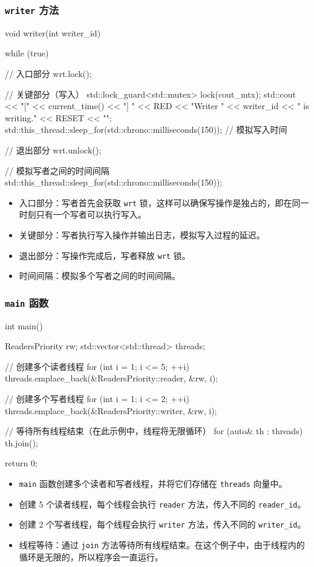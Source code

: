 \subsubsection{\texttt{writer} 方法}
\begin{cppcode}
void writer(int writer_id)
{
    while (true) {
        // 入口部分
        wrt.lock();

        // 关键部分（写入）
        {
            std::lock_guard<std::mutex> lock(cout_mtx);
            std::cout << "[" << current_time() << "] "
                      << RED << "Writer " << writer_id << " is writing." << RESET << "\n";
        }
        std::this_thread::sleep_for(std::chrono::milliseconds(150)); // 模拟写入时间

        // 退出部分
        wrt.unlock();

        // 模拟写者之间的时间间隔
        std::this_thread::sleep_for(std::chrono::milliseconds(150));
    }
}
\end{cppcode}
\begin{itemize}
    \item 入口部分：写者首先会获取 \texttt{wrt} 锁，这样可以确保写操作是独占的，即在同一时刻只有一个写者可以执行写入。
	\item 关键部分：写者执行写入操作并输出日志，模拟写入过程的延迟。
	\item 退出部分：写操作完成后，写者释放 \texttt{wrt} 锁。
	\item 时间间隔：模拟多个写者之间的时间间隔。
\end{itemize}

\subsubsection{\texttt{main} 函数}
\begin{cppcode}
int main()
{
    ReadersPriority rw;
    std::vector<std::thread> threads;

    // 创建多个读者线程
    for (int i = 1; i <= 5; ++i) {
        threads.emplace_back(&ReadersPriority::reader, &rw, i);
    }

    // 创建多个写者线程
    for (int i = 1; i <= 2; ++i) {
        threads.emplace_back(&ReadersPriority::writer, &rw, i);
    }

    // 等待所有线程结束（在此示例中，线程将无限循环）
    for (auto& th : threads) {
        th.join();
    }

    return 0;
}
\end{cppcode}
\begin{itemize}
    \item \texttt{main} 函数创建多个读者和写者线程，并将它们存储在 \texttt{threads} 向量中。
	\item 创建 5 个读者线程，每个线程会执行 \texttt{reader} 方法，传入不同的 \texttt{reader\_id}。
	\item 创建 2 个写者线程，每个线程会执行 \texttt{writer} 方法，传入不同的 \texttt{writer\_id}。
	\item 线程等待：通过 \texttt{join} 方法等待所有线程结束。在这个例子中，由于线程内的循环是无限的，所以程序会一直运行。
\end{itemize}

